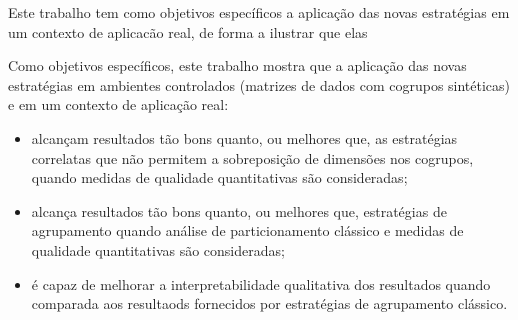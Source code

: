 \documentclass[
    12pt,                %
    oneside,            %
    a4paper,            %
    english,            %
    brazil                %
    ]{abntex2ppgsi}
\begin{document}

Este trabalho tem como objetivos específicos a aplicação das novas estratégias em um contexto de aplicacão real, de forma a ilustrar que elas

Como objetivos específicos, este trabalho mostra que a aplicação das novas estratégias em ambientes controlados (matrizes de dados com cogrupos sintéticas) e em um contexto de aplicação real:

\begin{itemize}
    \item alcançam resultados tão bons quanto, ou melhores que, as estratégias correlatas que não permitem a sobreposição de dimensões nos cogrupos, quando medidas de qualidade quantitativas são consideradas;
    \item alcança resultados tão bons quanto, ou melhores que, estratégias de agrupamento quando análise de particionamento clássico e medidas de qualidade quantitativas são consideradas;
    \item é capaz de melhorar a interpretabilidade qualitativa dos resultados quando comparada aos resultaods fornecidos por estratégias de agrupamento clássico. 
\end{itemize}






\end{document}
